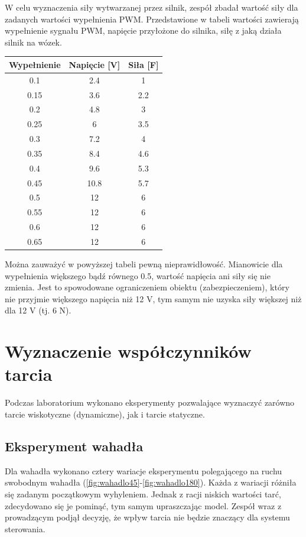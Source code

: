 \documentclass[12pt]{article}
\numberwithin{equation}{section}
\begin{document}
W celu wyznaczenia siły wytwarzanej przez silnik, zespół zbadał wartość siły dla zadanych wartości wypełnienia PWM. Przedstawione w tabeli wartości zawierają wypełnienie sygnału PWM, napięcie przyłożone do silnika, siłę z jaką działa silnik na wózek.

\begin{center}
\begin{tabular}{c|c|c}
     Wypełnienie & Napięcie [V] & Siła [F]\\\hline
     0.1 & 2.4 & 1\\\hline
     0.15 & 3.6 & 2.2\\\hline
     0.2 & 4.8 & 3\\\hline
     0.25 & 6 & 3.5\\\hline
     0.3 & 7.2 & 4\\\hline
     0.35 & 8.4 & 4.6\\\hline
     0.4 & 9.6 & 5.3\\\hline
     0.45 & 10.8 & 5.7\\\hline
     0.5 & 12 & 6\\\hline
     0.55 & 12 & 6\\\hline
     0.6 & 12 & 6\\\hline
     0.65 & 12 & 6
\end{tabular}
\end{center}

Można zauważyć w powyższej tabeli pewną nieprawidłowość. Mianowicie dla wypełnienia większego bądź równego 0.5, wartość napięcia ani siły się nie zmienia. Jest to spowodowane ograniczeniem obiektu (zabezpieczeniem), który nie przyjmie większego napięcia niż 12 V, tym samym nie uzyska siły większej niż dla 12 V (tj. 6 N).

\newpage

\section{Wyznaczenie współczynników tarcia}

Podczas laboratorium wykonano eksperymenty pozwalające wyznaczyć zarówno tarcie wiskotyczne (dynamiczne), jak i tarcie statyczne.

\subsection{Eksperyment wahadła}

Dla wahadła wykonano cztery wariacje eksperymentu polegającego na ruchu swobodnym wahadła (\ref{fig:wahadlo45}-\ref{fig:wahadlo180}). Każda z wariacji różniła się zadanym początkowym wyhyleniem. Jednak z racji niskich wartości tarć, zdecydowano się je pominąć, tym samym upraszczając model. Zespół wraz z prowadzącym podjął decyzję, że wpływ tarcia nie będzie znaczący dla systemu sterowania.
\end{document}

